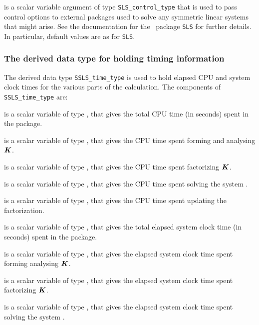 \documentclass{galahad}
\newcommand{\packagename}{SSLS}
\begin{document}
\begin{description}
 is a scalar variable argument of type
{\tt SLS\_control\_type} that is used to pass control
options to external packages used to solve any symmetric
linear systems that might arise.
See the documentation for the \galahad\ package {\tt SLS} for further details.
In particular, default values are as for {\tt SLS}.

\end{description}


\subsubsection{The derived data type for holding timing
 information}\label{typetime}
The derived data type
{\tt \packagename\_time\_type}
is used to hold elapsed CPU and system clock times for the various parts
of the calculation. The components of
{\tt \packagename\_time\_type}
are:
\begin{description}
 is a scalar variable of type \realdp, that gives
 the total CPU time (in seconds) spent in the package.

 is a scalar variable of type \realdp, that gives
 the CPU time spent forming and analysing ${\bm{K}}$.

 is a scalar variable of type \realdp, that gives
 the CPU time spent factorizing ${\bm{K}}$.

 is a scalar variable of type \realdp, that gives
 the CPU time spent solving the system .

 is a scalar variable of type \realdp, that gives
 the CPU time spent updating the factorization.

 is a scalar variable of type \realdp, that gives
 the total elapsed system clock time (in seconds) spent in the package.

 is a scalar variable of type \realdp, that gives
 the elapsed system clock time spent forming analysing ${\bm{K}}$.

 is a scalar variable of type \realdp, that gives
 the elapsed system clock time spent factorizing ${\bm{K}}$.

 is a scalar variable of type \realdp, that gives
 the elapsed system clock time spent solving the system .

\end{description}
\end{document}
